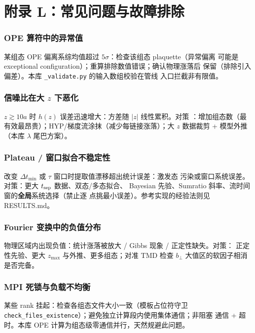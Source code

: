 \documentclass[11pt,a4paper]{ctexart}
\newcommand{\abs}[1]{\lvert #1\rvert}
\newcommand{\code}[1]{\texttt{#1}}
\begin{document}
\section{附录 L：常见问题与故障排除}

\subsubsection{OPE 算符中的异常值}

某组态 OPE 偏离系综均值超过 $5\sigma$：检查该组态 plaquette（异常偏离
可能是 exceptional configuration）；重算排除数值错误；确认物理涨落后
保留（排除引入偏差）。本库 \code{\_validate.py} 的输入数组校验在管线
入口拦截非有限值。

\subsubsection{信噪比在大 $z$ 下恶化}

$z\gtrsim10a$ 时 $h(z)$ 误差迅速增大：方差随 $\abs{z}$ 线性累积。对策
：增加组态数（最有效最昂贵）；HYP/梯度流涂抹（减少每链接涨落）；大
$z$ 数据裁剪 + 模型外推（本库 $\lambda$ 尾巴方案）。

\subsubsection{Plateau / 窗口拟合不稳定性}

改变 $\Delta t_{\min}$ 或 $\tau$ 窗口时提取值漂移超出统计误差：激发态
污染或窗口系统误差。对策：更大 $t_{\rm sep}$ 数据、双态/多态拟合、
Bayesian 先验、Sumratio 斜率、流时间窗的\textbf{全局}系统选择（禁止逐
点挑最小误差）。参考实现的经验法则见 RESULTS.md。

\subsubsection{Fourier 变换中的负值分布}

物理区域内出现负值：统计涨落被放大 / Gibbs 现象 / 正定性缺失。对策：
正定性先验、更大 $z_{\max}$ 与外推、更多组态；对准 TMD 检查
$b_\perp$ 大值区的软因子相消是否完备。

\subsubsection{MPI 死锁与负载不均衡}

某些 rank 挂起：检查各组态文件大小一致（模板占位符守卫
\code{check\_files\_existence}）；避免独立计算段内使用集体通信；非阻塞
通信 + 超时。本库 OPE 计算为组态级零通信并行，天然规避此问题。
\end{document}
